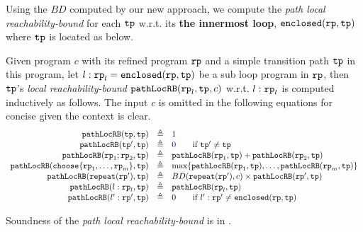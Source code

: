 Using the $BD$ computed by our new approach, we compute the \emph{path local reachability-bound} for
each $\mathtt{tp}$ w.r.t. its \textbf{the innermost loop}, $\mathtt{enclosed}(\mathtt{rp}, \mathtt{tp})$ where $\mathtt{tp}$ is located as below.
\begin{defn}
    \label{def:pathlocalrb}
    Given program $c$ with its refined program $\mathtt{rp}$ and a simple transition path $\mathtt{tp}$ in this program, 
    let $l: \mathtt{rp}_l = \mathtt{enclosed}(\mathtt{rp}, \mathtt{tp})$ be a sub loop program in $\mathtt{rp}$,
    then $\mathtt{tp}$'s \emph{local reachability-bound} $\mathtt{pathLocRB}(\mathtt{rp}_l, \mathtt{tp}, c)$ w.r.t. $l: \mathtt{rp}_l$
    is computed inductively as follows.
    The input $c$ is omitted in the following equations for concise given the context is clear.
    {\small
    \[
    \begin{array}{rcl}
      \outinB(\tpath, \tpath) & \triangleq & 1 \\
      \outinB(\tpath', \tpath) & \triangleq & \highlight{0} \qquad \text{if } \tpath' \neq \tpath\\
      \outinB(\rprog_1;\rprog_2, \tpath) & \triangleq & \outinB(\rprog_1, \tpath) + \outinB(\rprog_2, \tpath) \\
      \outinB(\rpchoose{\rprog_1, \ldots, \rprog_m }, \tpath) & \triangleq 
      & \max\left\{ \outinB(\rprog_1, \tpath), \ldots, \outinB(\rprog_m, \tpath) \right\} \\
      \outinB(\rprepeat(\rprog'), \tpath) & \triangleq 
      & BD(\rprepeat(\rprog'), c) \times \outinB(\rprog', \tpath)
       \\
       \outinB(l: \rprog_l, \tpath) & \triangleq & \outinB(\rprog_l, \tpath) \\
       \outinB(l': \rprog', \tpath) & \triangleq & 0  \qquad \text{if } l': \rprog' \neq \kw{enclosed}(\rprog, \tpath)
    \end{array}
    \]
    }
  \end{defn}
Soundness of the \emph{path local reachability-bound} is in .

